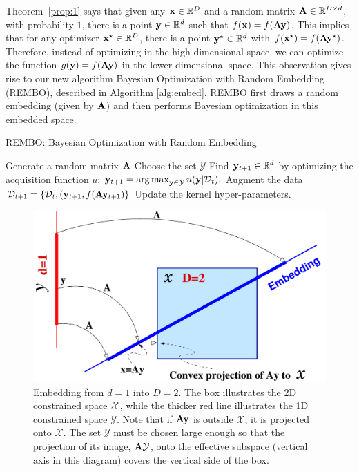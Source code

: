 \documentclass{article}
\DeclareMathOperator*{\argmax}{arg\,max}
\begin{document}
Theorem~\ref{prop:1} says that given any $\mathbf{x} \in \mathbb{R}^D$ and a random matrix $\mathbf{A} \in \mathbb{R}^{D\times d}$, with probability $1$, there is a point $\mathbf{y} \in \mathbb{R}^d$ such that $f(\mathbf{x}) = f(\mathbf{A}\mathbf{y})$. 
This implies that for any optimizer $\mathbf{x}^{\star} \in \mathbb{R}^D$, there is a point $\mathbf{y}^{\star} \in \mathbb{R}^d$ with $f(\mathbf{x}^\star) = f(\mathbf{A}\mathbf{y}^{\star})$. Therefore, instead of optimizing in the high dimensional space, we can optimize the function $g(\mathbf{y}) = f(\mathbf{A}\mathbf{y})$ in the lower dimensional space.
This observation gives rise to our new algorithm Bayesian Optimization with Random Embedding (REMBO), described in Algorithm \ref{alg:embed}. REMBO first draws a random embedding (given by $\mathbf{A}$) and then performs Bayesian optimization in this embedded space.

\begin{algorithm}[h!]
\caption{REMBO: Bayesian Optimization with Random Embedding}
\label{alg:embed}
\begin{algorithmic}[1]
{
\STATE Generate a random matrix $\mathbf{A}$
\STATE Choose the set $\mathcal{Y}$
  \STATE Find $\mathbf{y}_{t+1} \in \mathbb{R}^d$ by optimizing the acquisition function $u$: $\vy_{t+1} = \argmax_{\vy\in \mathcal{Y}} u(\vy|\mathcal{D}_t).$ 
  \STATE Augment the data $\mathcal{D}_{t+1} = \{\mathcal{D}_{t}, (\mathbf{y}_{t+1}, f(\mathbf{A}\mathbf{y}_{t+1}) \}$
\STATE Update the kernel hyper-parameters.
\ENDFOR
}
\end{algorithmic}
\end{algorithm}


\begin{figure}[t!]
\centering
  \includegraphics[scale=0.28]{figures/projection.pdf}
  \caption{Embedding from $d=1$ into $D=2$. The box illustrates the 2D constrained space ${\cal X}$, while the thicker red line illustrates the 1D constrained space $\mathcal{Y}$. Note that if $\mathbf{A}\mathbf{y}$ is outside $\mathcal{X}$, it is projected onto $\mathcal{X}$. The set $\mathcal{Y}$ must be chosen large enough so that the projection of its image, $\mathbf{A} \mathcal{Y}$, onto the effective subspace (vertical axis in this diagram) covers the vertical side of the box.}
  \label{fig:proj}
  \vspace{-1em}
\end{figure}
\end{document}
